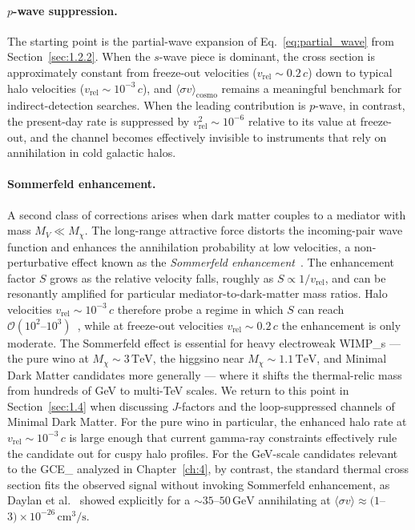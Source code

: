 \paragraph{$p$-wave suppression.}
The starting point is the partial-wave expansion of Eq.~\eqref{eq:partial_wave} from Section~\ref{sec:1.2.2}.
When the $s$-wave piece is dominant, the cross section is approximately constant from freeze-out velocities ($v_\mathrm{rel}\sim 0.2\,c$) down to typical halo velocities ($v_\mathrm{rel}\sim 10^{-3}\,c$), and $\langle\sigma v\rangle_\mathrm{cosmo}$ remains a meaningful benchmark for indirect-detection searches.
When the leading contribution is $p$-wave, in contrast, the present-day rate is suppressed by $v_\mathrm{rel}^2 \sim 10^{-6}$ relative to its value at freeze-out, and the channel becomes effectively invisible to instruments that rely on annihilation in cold galactic halos.

\paragraph{Sommerfeld enhancement.}
A second class of corrections arises when dark matter couples to a mediator with mass $M_V \ll M_\chi$.
The long-range attractive force distorts the incoming-pair wave function and enhances the annihilation probability at low velocities, a non-perturbative effect known as the \emph{Sommerfeld enhancement}~\cite{Hisano:2004ds,ArkaniHamed:2008qn}.
The enhancement factor $S$ grows as the relative velocity falls, roughly as $S\propto 1/v_\mathrm{rel}$, and can be resonantly amplified for particular mediator-to-dark-matter mass ratios.
Halo velocities $v_\mathrm{rel}\sim 10^{-3}\,c$ therefore probe a regime in which $S$ can reach $\mathcal{O}(10^2\text{--}10^3)$~\cite{Hisano:2004ds}, while at freeze-out velocities $v_\mathrm{rel}\sim 0.2\,c$ the enhancement is only moderate.
The Sommerfeld effect is essential for heavy electroweak \glspl{WIMP_} --- the pure wino at $M_\chi\sim 3\,\mathrm{TeV}$, the higgsino near $M_\chi\sim 1.1\,\mathrm{TeV}$, and Minimal Dark Matter candidates more generally --- where it shifts the thermal-relic mass from hundreds of GeV to multi-TeV scales. We return to this point in Section~\ref{sec:1.4} when discussing $J$-factors and the loop-suppressed channels of Minimal Dark Matter.
For the pure wino in particular, the enhanced halo rate at $v_\mathrm{rel}\sim 10^{-3}\,c$ is large enough that current gamma-ray constraints effectively rule the candidate out for cuspy halo profiles.
For the GeV-scale candidates relevant to the \gls{GCE_} analyzed in Chapter~\ref{ch:4}, by contrast, the standard thermal cross section fits the observed signal without invoking Sommerfeld enhancement, as Daylan et al.~\cite{Daylan:2014rsa} showed explicitly for a $\sim 35$--$50\,\mathrm{GeV}$ \WIMP annihilating at $\langle\sigma v\rangle \approx (1$--$3)\times 10^{-26}\,\mathrm{cm}^3/\mathrm{s}$.

